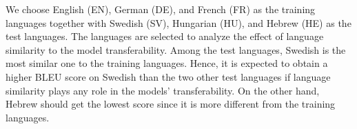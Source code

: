 \documentclass[11pt,a4paper]{article}
\begin{document}
We choose English (EN), German (DE), and French (FR) as the training languages together with Swedish (SV), Hungarian (HU), and Hebrew (HE) as the test languages. The languages are selected to analyze the effect of language similarity to the model transferability. Among the test languages, Swedish is the most similar one to the training languages. Hence, it is expected to obtain a higher BLEU score on Swedish than the two other test languages if language similarity plays any role in the models' transferability. On the other hand, Hebrew should get the lowest score since it is more different from the training languages. %

\end{document}
